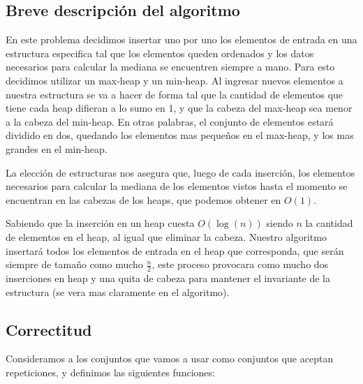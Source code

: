 \documentclass{article}
\theoremstyle{definition}
\theoremstyle{remark}
\begin{document}
\subsection{Breve descripción del algoritmo}

En este problema decidimos insertar uno por uno los elementos de entrada en una estructura especifica tal que los elementos queden ordenados y los datos necesarios para calcular la mediana se encuentren siempre a mano. Para esto decidimos utilizar un max-heap y un min-heap. Al ingresar nuevos elementos a nuestra estructura se va a hacer de forma tal que la cantidad de elementos que tiene cada heap difieran a lo sumo en 1, y que la cabeza del max-heap sea menor a la cabeza del min-heap. En otras palabras, el conjunto de elementos estará dividido en dos, quedando los elementos mas pequeños en el max-heap, y los mas grandes en el min-heap.

La elección de estructuras nos asegura que, luego de cada inserción, los elementos necesarios para calcular la mediana de los elementos vistos hasta el momento se encuentran en las cabezas de los heaps, que podemos obtener en $O(1)$.

Sabiendo que la inserción en un heap cuesta $O(\log(n))$ siendo $n$ la cantidad de elementos en el heap, al igual que eliminar la cabeza. Nuestro algoritmo insertará todos los elementos de entrada en el heap que corresponda, que serán siempre de tamaño como mucho $\frac{n}{2}$, este proceso provocara como mucho dos inserciones en heap y una quita de cabeza para mantener el invariante de la estructura (se vera mas claramente en el algoritmo).

\subsection{Correctitud}

Consideramos a los conjuntos que vamos a usar como conjuntos que aceptan repeticiones, y definimos las siguientes funciones:

\newcommand{\twopartdef}[4]
{
	\left\{
		\begin{array}{ll}
			#1 & \mbox{if } #2 \\
			#3 & \mbox{if } #4 \\
		\end{array}
	\right.
}

\newcommand{\fourpartdef}[8]
{
	\left\{
		\begin{array}{ll}
			#1 & \mbox{if } #2 \\
			#3 & \mbox{if } #4 \\
			#5 & \mbox{if } #6 \\
			#7 & \mbox{if } #8 \\
		\end{array}
	\right.
}
\end{document}
